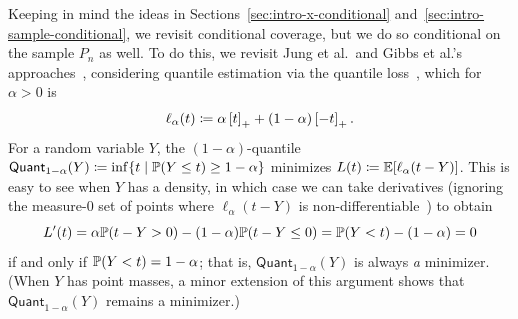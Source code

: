 \documentclass[11pt]{article}
\newcommand{\loss}{\ell}
\newcommand{\poploss}{L}
\newcommand{\quant}{\mathsf{Quant}}
\begin{document}
Keeping in mind the ideas in Sections~\ref{sec:intro-x-conditional}
and~\ref{sec:intro-sample-conditional}, we revisit conditional coverage,
but we do so conditional on the sample $P_n$ as well.
%
To do this, we revisit Jung et al.\ and Gibbs et al.'s
approaches~\citep{JungNoRaRo23,GibbsChCa23}, considering
quantile estimation via the quantile loss~\citep{KoenkerBa78},
which for $\alpha > 0$ is
\begin{equation*}
  \loss_\alpha(t) \defeq \alpha \hinge{t} + (1 - \alpha) \hinge{-t}.
\end{equation*}
For a random variable $Y$, the $(1 - \alpha)$-quantile $\quant_{1 -
  \alpha}(Y) \defeq \inf\{t \mid \P(Y \le t) \ge 1 - \alpha\}$ minimizes
$\poploss(t) \defeq \E[\loss_\alpha(t - Y)]$.
%
This is easy to see when $Y$ has a density, in which case we can take
derivatives (ignoring the measure-0 set of points where $\loss_\alpha(t -
Y)$ is non-differentiable~\cite{Bertsekas73}) to obtain
\begin{equation*}
  \poploss'(t) = \alpha\P(t - Y > 0) - (1 - \alpha) \P(t - Y \le 0)
  = \P(Y < t) - (1 - \alpha) = 0
\end{equation*}
if and only if $\P(Y < t) = 1 - \alpha$; that is,
$\quant_{1 - \alpha}(Y)$ is always \emph{a} minimizer.
%
(When $Y$ has point masses, a minor extension of this
argument shows that $\quant_{1 - \alpha}(Y)$ remains a minimizer.)
\end{document}
